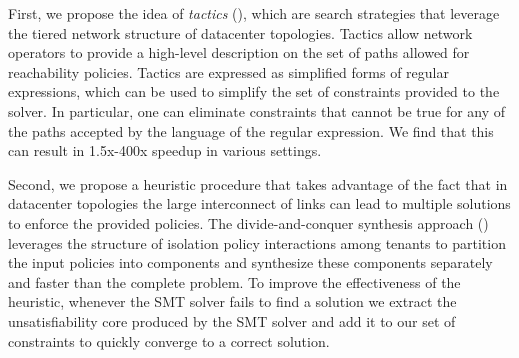 First, we propose the idea of \emph{tactics} (),
which are search strategies that leverage the tiered network structure
of datacenter topologies.
Tactics allow network operators to provide a high-level description on
the set of paths allowed for reachability policies.  Tactics are
expressed as simplified forms of regular expressions, which can be
used to simplify the set of constraints provided to the solver.  In
particular, one can eliminate constraints that cannot be true for any
of the paths accepted by the language of the regular expression. We
find that this can result in 1.5x-400x speedup in various settings.

Second, we propose a heuristic procedure that takes advantage of the fact that in 
datacenter topologies the large
interconnect of links can lead to multiple solutions 
to enforce the provided policies.  
The divide-and-conquer
synthesis approach () leverages the structure of
isolation policy interactions among tenants to partition the input
policies into components and synthesize these components separately and
faster than the complete problem. To improve the effectiveness of the
heuristic, whenever the SMT solver fails to find a solution we extract
the unsatisfiability core produced by the SMT solver and 
add it to our set of constraints to quickly converge to a correct solution.


